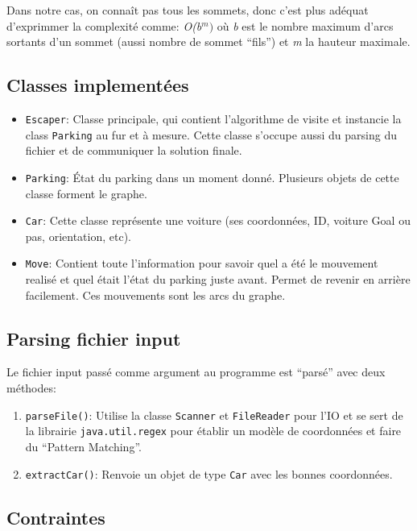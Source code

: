 \documentclass[11pt,a4paper]{article}
\begin{document}
Dans notre cas, on connaît pas tous les sommets, donc c'est plus
adéquat d'exprimmer la complexité comme: \emph{O(b$^{m})$} où \emph{b}
est le nombre maximum d'arcs sortants d'un sommet (aussi nombre de
sommet ``fils'') et \emph{m} la hauteur maximale.



\subsection{Classes implementées}

\begin{itemize}
\item \texttt{Escaper}: Classe principale, qui contient l'algorithme
  de visite et instancie la class \texttt{Parking} au fur et à
  mesure. Cette classe s'occupe aussi du parsing du fichier et de
  communiquer la solution finale.
\item \texttt{Parking}: État du parking dans un moment
  donné. Plusieurs objets de cette classe forment le graphe.
\item \texttt{Car}: Cette classe représente une voiture (ses
  coordonnées, ID, voiture Goal ou pas, orientation, etc).
\item \texttt{Move}: Contient toute l'information pour savoir quel a
  été le mouvement realisé et quel était l'état du parking juste
  avant. Permet de revenir en arrière facilement. Ces mouvements sont
  les arcs du graphe.
\end{itemize}



\subsection{Parsing fichier input}

Le fichier input passé comme argument au programme est ``parsé'' avec
deux méthodes:

\begin{enumerate}
\item \texttt{parseFile()}: Utilise la classe \texttt{Scanner} et
  \texttt{FileReader} pour l'IO et se sert de la librairie
  \texttt{java.util.regex} pour établir un modèle de coordonnées et
  faire du ``Pattern Matching''.
\item \texttt{extractCar()}: Renvoie un objet de type \texttt{Car}
  avec les bonnes coordonnées.
\end{enumerate}

\subsection{Contraintes}
\end{document}
